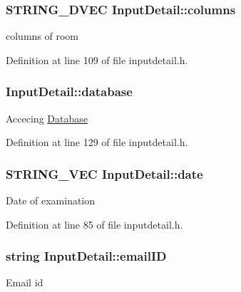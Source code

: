 \hypertarget{classInputDetail_a8563f1b6c4d2e74a9b8421a12585395c}{
\subsubsection[{columns}]{\setlength{\rightskip}{0pt plus 5cm}\-S\-T\-R\-I\-N\-G\-\_\-D\-V\-E\-C {\bf \-Input\-Detail\-::columns}}}\label{db/d6e/classInputDetail_a8563f1b6c4d2e74a9b8421a12585395c}
columns of room 

\-Definition at line 109 of file inputdetail.\-h.

\hypertarget{classInputDetail_a479cd6c13833bd5de6e5630078c961b6}{
\subsubsection[{database}]{ {\bf \-Input\-Detail\-::database}}}\label{db/d6e/classInputDetail_a479cd6c13833bd5de6e5630078c961b6}
\-Accecing \hyperlink{classDatabase}{\-Database} 

\-Definition at line 129 of file inputdetail.\-h.

\hypertarget{classInputDetail_a7d1c7ceb33eb86058e00c3a6a68cae4a}{
\subsubsection[{date}]{\setlength{\rightskip}{0pt plus 5cm}\-S\-T\-R\-I\-N\-G\-\_\-\-V\-E\-C {\bf \-Input\-Detail\-::date}}}\label{db/d6e/classInputDetail_a7d1c7ceb33eb86058e00c3a6a68cae4a}
\-Date of examination 

\-Definition at line 85 of file inputdetail.\-h.

\hypertarget{classInputDetail_ad3f1db4fddbe0d4efbf1d5bc74d52257}{
\subsubsection[{email\-I\-D}]{\setlength{\rightskip}{0pt plus 5cm}string {\bf \-Input\-Detail\-::email\-I\-D}}}\label{db/d6e/classInputDetail_ad3f1db4fddbe0d4efbf1d5bc74d52257}
\-Email id 


